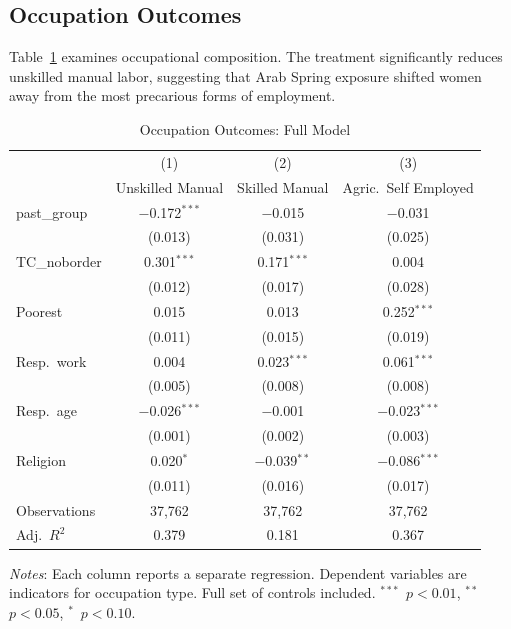 \documentclass[12pt,a4paper]{article}
\begin{document}
\subsection{Occupation Outcomes}

Table~\ref{tab:occupation} examines occupational composition. The treatment significantly reduces unskilled manual labor, suggesting that Arab Spring exposure shifted women away from the most precarious forms of employment.
\vspace{0.25cm}

\begin{table}[H]
\centering
\begin{threeparttable}
\caption{Occupation Outcomes: Full Model}
\label{tab:occupation}
\small
\begin{tabular}{@{}lccc@{}}
\toprule
 & (1) & (2) & (3) \\
 & Unskilled Manual & Skilled Manual & Agric.\ Self Employed \\
\midrule
past\_group  & $-$0.172$^{***}$ & $-$0.015 & $-$0.031 \\
             & (0.013) & (0.031) & (0.025) \\[3pt]
TC\_noborder & 0.301$^{***}$ & 0.171$^{***}$ & 0.004 \\
             & (0.012) & (0.017) & (0.028) \\[3pt]
Poorest      & 0.015 & 0.013 & 0.252$^{***}$ \\
             & (0.011) & (0.015) & (0.019) \\[3pt]
Resp.\ work  & 0.004 & 0.023$^{***}$ & 0.061$^{***}$ \\
             & (0.005) & (0.008) & (0.008) \\[3pt]
Resp.\ age   & $-$0.026$^{***}$ & $-$0.001 & $-$0.023$^{***}$ \\
             & (0.001) & (0.002) & (0.003) \\[3pt]
Religion     & 0.020$^{*}$ & $-$0.039$^{**}$ & $-$0.086$^{***}$ \\
             & (0.011) & (0.016) & (0.017) \\[4pt]
\midrule
Observations & 37,762 & 37,762 & 37,762 \\
Adj.\ $R^2$  & 0.379  & 0.181  & 0.367 \\
\bottomrule
\end{tabular}
\begin{tablenotes}[flushleft]
\footnotesize
\item \textit{Notes}: Each column reports a separate regression. Dependent variables are indicators for occupation type. Full set of controls included. $^{***}$~$p<0.01$, $^{**}$~$p<0.05$, $^{*}$~$p<0.10$.
\end{tablenotes}
\end{threeparttable}
\end{table}
\end{document}
